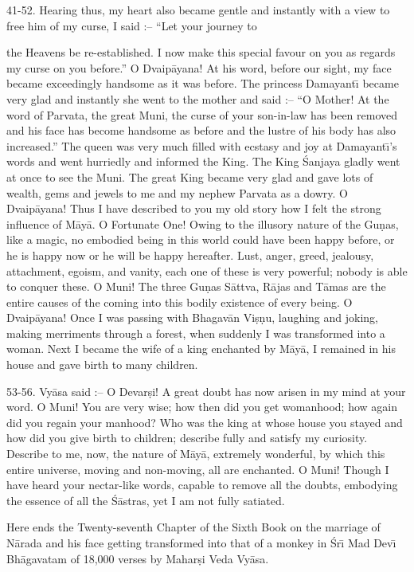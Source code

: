 41-52. Hearing thus, my heart also became gentle and instantly with a view to free him of my curse, I said :-- ``Let your journey to

the Heavens be re-established. I now make this special favour on you as regards my curse on you before.'' O Dvaip\=ayana! At his word, before our sight, my face became exceedingly handsome as it was before. The princess Damayant\={\i} became very glad and instantly she went to the mother and said :-- ``O Mother! At the word of Parvata, the great Muni, the curse of your son-in-law has been removed and his face has become handsome as before and the lustre of his body has also increased.'' The queen was very much filled with ecstasy and joy at Damayant\={\i}'s words and went hurriedly and informed the King. The King \'Sanjaya gladly went at once to see the Muni. The great King became very glad and gave lots of wealth, gems and jewels to me and my nephew Parvata as a dowry. O Dvaip\=ayana! Thus I have described to you my old story how I felt the strong influence of M\=ay\=a. O Fortunate One! Owing to the illusory nature of the Gu\d{n}as, like a magic, no embodied being in this world could have been happy before, or he is happy now or he will be happy hereafter. Lust, anger, greed, jealousy, attachment, egoism, and vanity, each one of these is very powerful; nobody is able to conquer these. O Muni! The three Gu\d{n}as S\=attva, R\=ajas and T\=amas are the entire causes of the coming into this bodily existence of every being. O Dvaip\=ayana! Once I was passing with Bhagav\=an Vi\d{s}\d{n}u, laughing and joking, making merriments through a forest, when suddenly I was transformed into a woman. Next I became the wife of a king enchanted by M\=ay\=a, I remained in his house and gave birth to many children.

53-56. Vy\=asa said :-- O Devar\d{s}i! A great doubt has now arisen in my mind at your word. O Muni! You are very wise; how then did you get womanhood; how again did you regain your manhood? Who was the king at whose house you stayed and how did you give birth to children; describe fully and satisfy my curiosity. Describe to me, now, the nature of M\=ay\=a, extremely wonderful, by which this entire universe, moving and non-moving, all are enchanted. O Muni! Though I have heard your nectar-like words, capable to remove all the doubts, embodying the essence of all the \'S\=astras, yet I am not fully satiated.

Here ends the Twenty-seventh Chapter of the Sixth Book on the marriage of N\=arada and his face getting transformed into that of a monkey in \'Sr\={\i} Mad Dev\={\i} Bh\=agavatam of 18,000 verses by Mahar\d{s}i Veda Vy\=asa.



